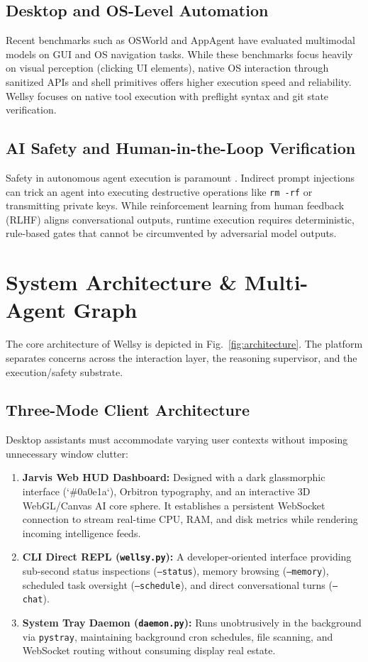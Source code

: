 \documentclass[conference]{IEEEtran}
\begin{document}
\subsection{Desktop and OS-Level Automation}
Recent benchmarks such as OSWorld \cite{xie2024osworld} and AppAgent \cite{yang2023appagent} have evaluated multimodal models on GUI and OS navigation tasks. While these benchmarks focus heavily on visual perception (clicking UI elements), native OS interaction through sanitized APIs and shell primitives offers higher execution speed and reliability. Wellsy focuses on native tool execution with preflight syntax and git state verification.

\subsection{AI Safety and Human-in-the-Loop Verification}
Safety in autonomous agent execution is paramount \cite{amodei2016concrete}. Indirect prompt injections \cite{greshake2023not} can trick an agent into executing destructive operations like \texttt{rm -rf} or transmitting private keys. While reinforcement learning from human feedback (RLHF) \cite{schulman2017proximal} aligns conversational outputs, runtime execution requires deterministic, rule-based gates that cannot be circumvented by adversarial model outputs.

\section{System Architecture \& Multi-Agent Graph}
The core architecture of Wellsy is depicted in Fig.~\ref{fig:architecture}. The platform separates concerns across the interaction layer, the reasoning supervisor, and the execution/safety substrate.

\subsection{Three-Mode Client Architecture}
Desktop assistants must accommodate varying user contexts without imposing unnecessary window clutter:
\begin{enumerate}
    \item \textbf{Jarvis Web HUD Dashboard:} Designed with a dark glassmorphic interface (`\#0a0e1a`), Orbitron typography, and an interactive 3D WebGL/Canvas AI core sphere. It establishes a persistent WebSocket connection to stream real-time CPU, RAM, and disk metrics while rendering incoming intelligence feeds.
    \item \textbf{CLI Direct REPL (\texttt{wellsy.py}):} A developer-oriented interface providing sub-second status inspections (\texttt{--status}), memory browsing (\texttt{--memory}), scheduled task oversight (\texttt{--schedule}), and direct conversational turns (\texttt{--chat}).
    \item \textbf{System Tray Daemon (\texttt{daemon.py}):} Runs unobtrusively in the background via \texttt{pystray}, maintaining background cron schedules, file scanning, and WebSocket routing without consuming display real estate.
\end{enumerate}
\end{document}
